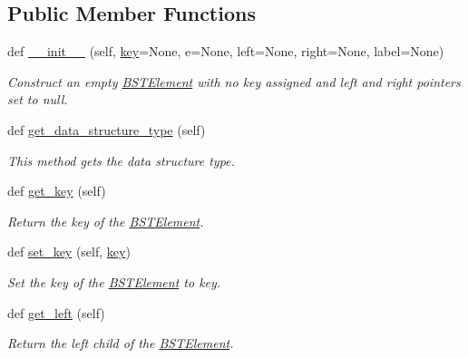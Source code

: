 \subsection*{Public Member Functions}
\begin{DoxyCompactItemize}
\item 
def \mbox{\hyperlink{class_bridges_1_1bst__element_1_1_b_s_t_element_a2d8abd4eca8f2643df2159aa12a920bf}{\+\_\+\+\_\+init\+\_\+\+\_\+}} (self, \mbox{\hyperlink{class_bridges_1_1bst__element_1_1_b_s_t_element_a1b04a3676ac84d889491f8a496aedb91}{key}}=None, e=None, left=None, right=None, label=None)
\begin{DoxyCompactList}\small\item\em Construct an empty \mbox{\hyperlink{class_bridges_1_1bst__element_1_1_b_s_t_element}{B\+S\+T\+Element}} with no key assigned and left and right pointers set to null. \end{DoxyCompactList}\item 
def \mbox{\hyperlink{class_bridges_1_1bst__element_1_1_b_s_t_element_a2ae53418d5efb075d9e63c675f4cdcdb}{get\+\_\+data\+\_\+structure\+\_\+type}} (self)
\begin{DoxyCompactList}\small\item\em This method gets the data structure type. \end{DoxyCompactList}\item 
def \mbox{\hyperlink{class_bridges_1_1bst__element_1_1_b_s_t_element_ac0ec75f813b838cf0f817ca6e4814766}{get\+\_\+key}} (self)
\begin{DoxyCompactList}\small\item\em Return the key of the \mbox{\hyperlink{class_bridges_1_1bst__element_1_1_b_s_t_element}{B\+S\+T\+Element}}. \end{DoxyCompactList}\item 
def \mbox{\hyperlink{class_bridges_1_1bst__element_1_1_b_s_t_element_ad72900f1e40534cbfe8b88d37e391750}{set\+\_\+key}} (self, \mbox{\hyperlink{class_bridges_1_1bst__element_1_1_b_s_t_element_a1b04a3676ac84d889491f8a496aedb91}{key}})
\begin{DoxyCompactList}\small\item\em Set the key of the \mbox{\hyperlink{class_bridges_1_1bst__element_1_1_b_s_t_element}{B\+S\+T\+Element}} to key. \end{DoxyCompactList}\item 
def \mbox{\hyperlink{class_bridges_1_1bst__element_1_1_b_s_t_element_a7f12207f3859f60be107468000cc2375}{get\+\_\+left}} (self)
\begin{DoxyCompactList}\small\item\em Return the left child of the \mbox{\hyperlink{class_bridges_1_1bst__element_1_1_b_s_t_element}{B\+S\+T\+Element}}. \end{DoxyCompactList}\item 

\end{DoxyCompactItemize}
